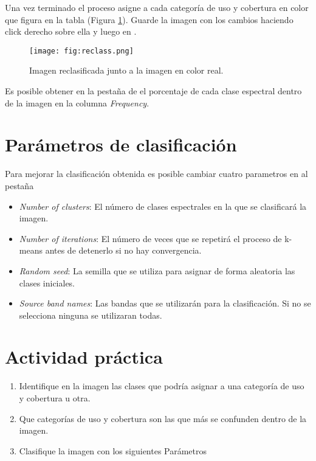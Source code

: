 Una vez terminado el proceso asigne a cada categoría de uso y cobertura en color que figura en la tabla (Figura \ref{fig:resclass}). Guarde la imagen con los cambios haciendo click derecho sobre ella y luego en .

\begin{figure}[h!]
    \centering
    \texttt{[image: fig:reclass.png]}
    \caption{Imagen reclasificada junto a la imagen en color real.}
    \label{fig:resclass}
\end{figure}

Es posible obtener en la pestaña de  el porcentaje de cada clase espectral dentro de la imagen en la columna \emph{Frequency}.

\section{Parámetros de clasificación}

Para mejorar la clasificación obtenida es posible cambiar cuatro parametros en al pestaña 

\begin{itemize}
  \item \emph{Number of clusters}: El número de clases espectrales en la que se clasificará la imagen.
  \item \emph{Number of iterations}: El número de veces que se repetirá el proceso de k-means antes de detenerlo si no hay convergencia.
  \item \emph{Random seed}: La semilla que se utiliza para asignar de forma aleatoria las clases iniciales.
  \item \emph{Source band names}: Las bandas que se utilizarán para la clasificación. Si no se selecciona ninguna se utilizaran todas.
\end{itemize}

\section{Actividad práctica}

\begin{enumerate}
  \item Identifique en la imagen las clases que podría asignar a una categoría de uso y cobertura u otra.
  \item Que categorías de uso y cobertura son las que más se confunden dentro de la imagen.
  \item Clasifique la imagen con los siguientes Parámetros
\end{enumerate}

